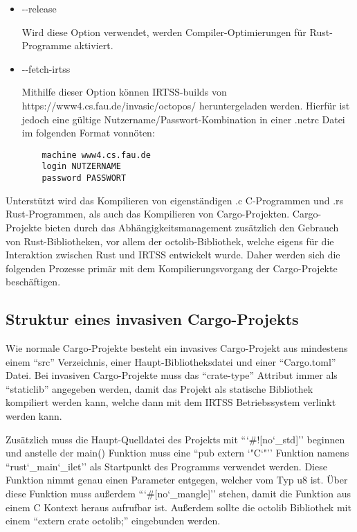 \begin{itemize}
	\item{-{}-release}

	Wird diese Option verwendet, werden Compiler-Optimierungen für Rust-Programme aktiviert.
	
	\item{-{}-fetch-irtss}

	Mithilfe dieser Option können IRTSS-builds von https://www4.cs.fau.de/invasic/octopos/ heruntergeladen werden. Hierfür ist jedoch
	eine gültige Nutzername/Passwort-Kombination in einer .netrc Datei im folgenden Format vonnöten:
	\begin{verbatim}
	machine www4.cs.fau.de
	login NUTZERNAME
	password PASSWORT
	\end{verbatim}
\end{itemize}

Unterstützt wird das Kompilieren von eigenständigen .c C-Programmen und .rs Rust-Programmen, als auch das Kompilieren von
Cargo-Projekten. Cargo-Projekte bieten durch das Abhängigkeitsmanagement zusätzlich den Gebrauch von Rust-Bibliotheken, vor
allem der octolib-Bibliothek, welche eigens für die Interaktion zwischen Rust und IRTSS entwickelt wurde. Daher werden sich die
folgenden Prozesse primär mit dem Kompilierungsvorgang der Cargo-Projekte beschäftigen.

\subsection{Struktur eines invasiven Cargo-Projekts}

Wie normale Cargo-Projekte besteht ein invasives Cargo-Projekt aus mindestens einem ``src'' Verzeichnis, einer Haupt-Bibliotheksdatei
und einer ``Cargo.toml'' Datei. Bei invasiven Cargo-Projekte muss das ``crate-type'' Attribut immer als ``staticlib'' angegeben werden,
damit das Projekt als statische Bibliothek kompiliert werden kann, welche dann mit dem IRTSS Betriebssystem verlinkt werden kann.

Zusätzlich muss die Haupt-Quelldatei des Projekts mit ``\char`#![no\char`_std]'' beginnen und anstelle der main()
Funktion muss eine ``pub extern \char`"C\char`"'' Funktion namens ``rust\char`_main\char`_ilet'' als Startpunkt des Programms
verwendet werden.
Diese Funktion nimmt genau einen Parameter entgegen, welcher vom Typ u8 ist.
Über diese  Funktion muss außerdem ``\char`#[no\char`_mangle]'' stehen, damit die Funktion aus einem C Kontext heraus
aufrufbar ist.
Außerdem sollte die octolib Bibliothek mit einem ``extern crate octolib;'' eingebunden werden.

